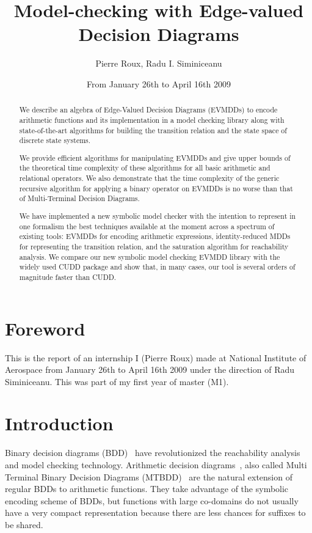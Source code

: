 \documentclass[a4paper,oneside,11pt,pdftex]{llncs}
\title{Model-checking with Edge-valued Decision Diagrams}
\author{Pierre Roux\inst{1}, Radu I. Siminiceanu\inst{2}}
\date{From January 26th to April 16th 2009}
\institute{École Normale Supérieure de Lyon, France
  \email{pierre.roux@ens-lyon.fr}
  \and
  National Institute of Aerospace, Hampton,
  Virginia~23666, USA.
  \email{radu@nianet.org}
}
\begin{document}
\maketitle

\thispagestyle{plain}

\begin{abstract}
We describe an algebra of Edge-Valued Decision Diagrams (EVMDDs) to
encode arithmetic functions and its implementation
in a model checking library along with state-of-the-art algorithms
for building the transition relation and the state space of discrete state systems.

We provide efficient algorithms for manipulating EVMDDs and give upper bounds of the
theoretical time complexity of these algorithms for all basic arithmetic 
and relational operators. We also demonstrate that the time complexity of the generic
recursive algorithm for applying a binary operator on EVMDDs is no worse than that
of Multi-Terminal Decision Diagrams.

We have implemented a new symbolic model checker with the intention to represent in one 
formalism the best techniques available at the moment across a spectrum of existing tools: 
EVMDDs for encoding arithmetic expressions, identity-reduced MDDs for representing 
the transition relation, and the saturation algorithm for reachability analysis. 
We compare our new symbolic model checking EVMDD library with the widely used
CUDD package and show that, in many cases, our tool is several orders of magnitude faster
than CUDD.
\end{abstract}

\section{Foreword}

This is the report of an internship I (Pierre Roux) made at National Institute of Aerospace from January 26th to April 16th 2009 under the direction of Radu Siminiceanu. This was part of my first year of master (M1).

\section{Introduction}

Binary decision diagrams (BDD)~\cite{Bryant1986} have revolutionized the 
reachability analysis and model checking technology.
%
Arithmetic decision diagrams~\cite{Somenzi1993}, also called
Multi Terminal Binary Decision Diagrams (MTBDD)~\cite{Clarke1995} are the 
natural extension of regular BDDs to arithmetic functions.
They take advantage of the symbolic encoding scheme of BDDs, but 
functions with large co-domains do not usually have a very compact 
representation because there are less chances for suffixes to be shared.
\end{document}
